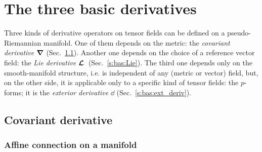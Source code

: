 
\section{The three basic derivatives}

Three kinds of derivative operators on tensor fields can be defined on a
pseudo-Riemannian manifold. One of them depends on the metric:
the \emph{covariant derivative} $\bm{\nabla}$ (Sec.~\ref{s:bas:cov_deriv}).
Another one depends on the choice of a
reference vector field: the \emph{Lie derivative} $\bm{\mathcal{L}}_{\bm{}}\,$ (Sec.~\ref{s:bas:Lie}).
The third one depends only on the smooth-manifold structure, i.e.
is independent of any (metric or vector) field, but, on the other side,
it is applicable
only to a specific kind of tensor fields: the $p$-forms; it is the
\emph{exterior derivative} $\dd$ (Sec.~\ref{s:bas:ext_deriv}).


\subsection{Covariant derivative} \label{s:bas:cov_deriv}


\subsubsection{Affine connection on a manifold} \label{s:bas:affine_connect}


